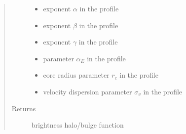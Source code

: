 \documentclass[letterpaper,10pt,english]{sphinxmanual}
\begin{document}
\begin{fulllineitems}
\begin{quote}
\begin{description}
\begin{itemize}
\item {} 
\sphinxAtStartPar
{} \textendash{} exponent \(\alpha\) in the {\hyperref[\detokenize{diffsph.profiles:diffsph.profiles.templates.hdz}]{}} profile

\item {} 
\sphinxAtStartPar
{} \textendash{} exponent \(\beta\) in the {\hyperref[\detokenize{diffsph.profiles:diffsph.profiles.templates.hdz}]{}} profile

\item {} 
\sphinxAtStartPar
{} \textendash{} exponent \(\gamma\) in the {\hyperref[\detokenize{diffsph.profiles:diffsph.profiles.templates.hdz}]{}} profile

\item {} 
\sphinxAtStartPar
{} \textendash{} parameter \(\alpha_E\) in the {\hyperref[\detokenize{diffsph.profiles:diffsph.profiles.templates.enst}]{}} profile

\item {} 
\sphinxAtStartPar
{} \textendash{} core radius parameter \(r_c\) in the {\hyperref[\detokenize{diffsph.profiles:diffsph.profiles.templates.cnfw}]{}} profile

\item {} 
\sphinxAtStartPar
{} \textendash{} velocity dispersion parameter \(\sigma_v\) in the {\hyperref[\detokenize{diffsph.profiles:diffsph.profiles.templates.sis}]{}} profile

\end{itemize}

\item[{Returns}] \leavevmode
\sphinxAtStartPar
brightness halo/bulge function

\end{description}\end{quote}

\end{fulllineitems}
\end{document}
